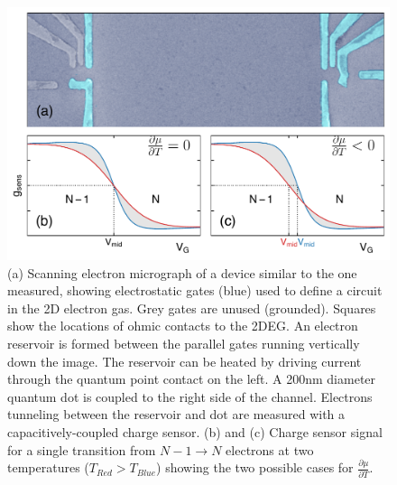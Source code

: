 \documentclass[twocolumn,showpacs,preprintnumbers,amsmath,amssymb,pra,aps,superscriptaddress]{revtex4-1}
\begin{document}
\begin{figure}[!]
        \includegraphics[width=1.0\columnwidth]{../figures/figure_1_no-annotation.pdf}
        \caption{\label{fig:fig1}(a) Scanning electron micrograph of a device similar to the one measured, showing electrostatic gates (blue) used to define a circuit in the 2D electron gas. Grey gates are unused (grounded). Squares show the locations of ohmic contacts to the 2DEG. An electron reservoir is formed between the parallel gates running vertically down the image. The reservoir can be heated by driving current through the quantum point contact on the left. A 200nm diameter quantum dot is coupled to the right side of the channel. Electrons tunneling between the reservoir and dot are measured with a capacitively-coupled charge sensor. (b) and (c) Charge sensor signal for a single transition from $N-1 \rightarrow N$ electrons at two temperatures ($T_{Red} > T_{Blue}$) showing the two possible cases for $\frac{\partial \mu}{\partial T}$.}
\end{figure}

\end{document}
